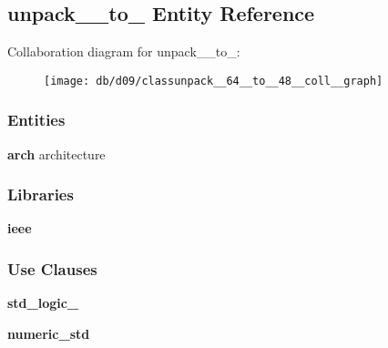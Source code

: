 \subsection{unpack\+\_\+\_\+to\+\_ Entity Reference}
\label{classunpack__64__to__48}


Collaboration diagram for unpack\+\_\+\_\+to\+\_\+:\nopagebreak
\begin{figure}[H]
\begin{center}
\leavevmode
\texttt{[image: db/d09/classunpack\_\_64\_\_to\_\_48\_\_coll\_\_graph]}
\end{center}
\end{figure}
\subsubsection*{Entities}
\begin{DoxyCompactItemize}
\item 
{\bf arch} architecture
\end{DoxyCompactItemize}
\subsubsection*{Libraries}
 \begin{DoxyCompactItemize}
\item 
{\bf ieee} 
\end{DoxyCompactItemize}
\subsubsection*{Use Clauses}
 \begin{DoxyCompactItemize}
\item 
{\bf std\+\_\+logic\+\_}   
\item 
{\bf numeric\+\_\+std}   
\end{DoxyCompactItemize}
